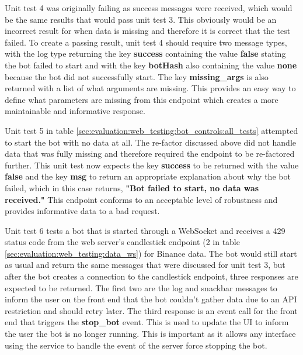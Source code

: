 Unit test 4 was originally failing as success messages were received, which would be the same results that would pass unit test 3. This obviously would be an incorrect result for when data is missing and therefore it is correct that the test failed. To create a passing result, unit test 4 should require two message types, with the log type returning the key \textbf{success} containing the value \textbf{false} stating the bot failed to start and with the key \textbf{botHash} also containing the value \textbf{none} because the bot did not successfully start. The key \textbf{missing\_args} is also returned with a list of what arguments are missing. This provides an easy way to define what parameters are missing from this endpoint which creates a more maintainable and informative response. 

Unit test 5 in table \ref{sec:evaluation:web_testing:bot_controls:all_tests} attempted to start the bot with no data at all. The re-factor discussed above did not handle data that was fully missing and therefore required the endpoint to be re-factored further. This unit test now expects the key \textbf{success} to be returned with the value \textbf{false} and the key \textbf{msg} to return an appropriate explanation about why the bot failed, which in this case returns, \textbf{"Bot failed to start, no data was received."} This endpoint conforms to an acceptable level of robustness and provides informative data to a bad request. 

Unit test 6 tests a bot that is started through a WebSocket and receives a 429 status code from the web server's candlestick endpoint (2 in table \ref{sec:evaluation:web_testing:data_ws}) for Binance data. The bot would still start as usual and return the same messages that were discussed for unit test 3, but after the bot creates a connection to the candlestick endpoint, three responses are expected to be returned. The first two are the log and snackbar messages to inform the user on the front end that the bot couldn't gather data due to an API restriction and should retry later. The third response is an event call for the front end that triggers the \textbf{stop\_bot} event. This is used to update the UI to inform the user the bot is no longer running. This is important as it allows any interface using the service to handle the event of the server force stopping the bot.

